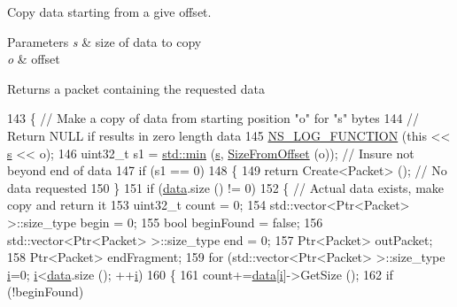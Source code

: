 Copy data starting from a give offset. 


\begin{DoxyParams}{Parameters}
{\em s} & size of data to copy \\
\hline
{\em o} & offset \\
\hline
\end{DoxyParams}
\begin{DoxyReturn}{Returns}
a packet containing the requested data 
\end{DoxyReturn}

\begin{DoxyCode}
143 \{ \textcolor{comment}{// Make a copy of data from starting position "o" for "s" bytes}
144   \textcolor{comment}{// Return NULL if results in zero length data}
145   \hyperlink{log-macros-disabled_8h_a90b90d5bad1f39cb1b64923ea94c0761}{NS\_LOG\_FUNCTION} (\textcolor{keyword}{this} << \hyperlink{generate__test__data__lte__sinr_8m_ad83eeb3a142285d1243a08c6b7026df8}{s} << o);
146   uint32\_t s1 = \hyperlink{80211b_8c_ac6afabdc09a49a433ee19d8a9486056d}{std::min} (\hyperlink{generate__test__data__lte__sinr_8m_ad83eeb3a142285d1243a08c6b7026df8}{s}, \hyperlink{classns3_1_1PendingData_a7224d2492c18490d1b75411db218949a}{SizeFromOffset} (o)); \textcolor{comment}{// Insure not beyond end of data}
147   \textcolor{keywordflow}{if} (s1 == 0)
148     \{
149       \textcolor{keywordflow}{return} Create<Packet> ();   \textcolor{comment}{// No data requested}
150     \}
151   \textcolor{keywordflow}{if} (\hyperlink{classns3_1_1PendingData_ab6ccbe1d5ca0d4536e4ad454971eb460}{data}.size () != 0)
152     \{ \textcolor{comment}{// Actual data exists, make copy and return it}
153       uint32\_t count = 0;
154       std::vector<Ptr<Packet> >::size\_type begin = 0;
155       \textcolor{keywordtype}{bool} beginFound = \textcolor{keyword}{false};
156       std::vector<Ptr<Packet> >::size\_type end = 0;
157       Ptr<Packet> outPacket;
158       Ptr<Packet> endFragment;
159       \textcolor{keywordflow}{for} (std::vector<Ptr<Packet> >::size\_type \hyperlink{bernuolliDistribution_8m_a6f6ccfcf58b31cb6412107d9d5281426}{i}=0; \hyperlink{bernuolliDistribution_8m_a6f6ccfcf58b31cb6412107d9d5281426}{i}<\hyperlink{classns3_1_1PendingData_ab6ccbe1d5ca0d4536e4ad454971eb460}{data}.size (); ++\hyperlink{bernuolliDistribution_8m_a6f6ccfcf58b31cb6412107d9d5281426}{i})
160         \{
161           count+=\hyperlink{classns3_1_1PendingData_ab6ccbe1d5ca0d4536e4ad454971eb460}{data}[\hyperlink{bernuolliDistribution_8m_a6f6ccfcf58b31cb6412107d9d5281426}{i}]->GetSize ();
162           \textcolor{keywordflow}{if} (!beginFound)

\end{DoxyCode}
